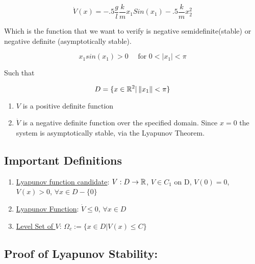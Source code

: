 $$
\dot{V}(x) = -.5 \frac{g}{l}\frac{k}{m}x_1 Sin(x_1) - .5 \frac{k}{m}x_2^2
$$

\noindent Which is the function that we want to verify is negative semidefinite(stable) or negative definite (asymptotically stable).

$$
x_1sin(x_1)> 0 \quad \text{ for } 0<|x_1|< \pi
$$

\noindent Such that

$$
D = \{ x \in \mathbb{R}^2 | \left\Vert x_1 \right\Vert < \pi \}
$$


\begin{enumerate}
  \item $V$ is a positive definite function
  \item $\dot{V}$ is a negative definite function over the specified domain. Since $x =0 $ the system is asymptotically stable, via the Lyapunov Theorem.
\end{enumerate}

\subsection*{Important Definitions}

\begin{enumerate}
  \item \underline{Lyapunov function candidate}:
  $V: D \rightarrow \mathbb{R}$, $V \in C_1$ on D, $V(0) = 0$, $V(x)>0$, $\forall x \in D - \{ 0 \}$
  \item \underline{Lyapunov Function}: $\dot{V}\leq 0 $, $\forall x \in D$
  \item \underline{Level Set of $V$}: $\Omega_c := \{ x \in D | V(x) \leq C \}$
\end{enumerate}


\subsection*{Proof of Lyapunov Stability:}
